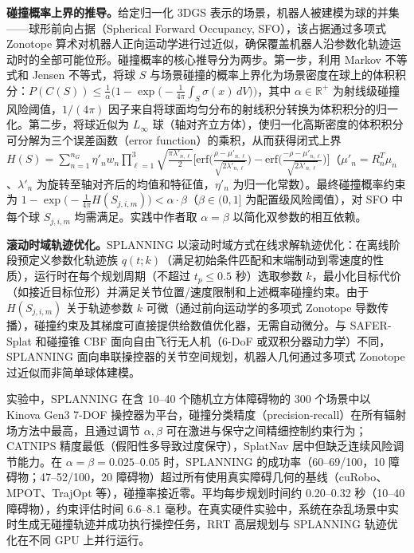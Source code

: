 \textbf{碰撞概率上界的推导。}给定归一化 3DGS 表示的场景，机器人被建模为球的并集——球形前向占据（Spherical Forward Occupancy, SFO），该占据通过多项式 Zonotope 算术对机器人正向运动学进行过近似，确保覆盖机器人沿参数化轨迹运动时的全部可能位形。碰撞概率的核心推导分为两步。第一步，利用 Markov 不等式和 Jensen 不等式，将球 $S$ 与场景碰撞的概率上界化为场景密度在球上的体积积分：$P(C(S)) \leq \frac{1}{\alpha}\bigl(1 - \exp\!\bigl(-\frac{1}{4\pi}\int_S \sigma(x)\, dV\bigr)\bigr)$，其中 $\alpha \in \mathbb{R}^+$ 为射线级碰撞风险阈值，$1/(4\pi)$ 因子来自将球面均匀分布的射线积分转换为体积积分的归一化。第二步，将球近似为 $L_\infty$ 球（轴对齐立方体），使归一化高斯密度的体积积分可分解为三个误差函数（error function）的乘积，从而获得闭式上界 $H(S) = \sum_{n=1}^{n_G} \eta'_n w_n \prod_{\ell=1}^{3} \sqrt{\frac{\pi \lambda'_{n,\ell}}{2}} \bigl[\mathrm{erf}\!\bigl(\frac{\rho - \mu'_{n,\ell}}{\sqrt{2\lambda'_{n,\ell}}}\bigr) - \mathrm{erf}\!\bigl(\frac{-\rho - \mu'_{n,\ell}}{\sqrt{2\lambda'_{n,\ell}}}\bigr)\bigr]$（$\mu'_n = R_n^T \mu_n$、$\lambda'_n$ 为旋转至轴对齐后的均值和特征值，$\eta'_n$ 为归一化常数）。最终碰撞概率约束为 $1 - \exp\!\bigl(-\frac{1}{4\pi} H(S_{j,i,m})\bigr) < \alpha \cdot \beta$（$\beta \in (0,1]$ 为配置级风险阈值），对 SFO 中每个球 $S_{j,i,m}$ 均需满足。实践中作者取 $\alpha = \beta$ 以简化双参数的相互依赖。

\textbf{滚动时域轨迹优化。}SPLANNING 以滚动时域方式在线求解轨迹优化：在离线阶段预定义参数化轨迹族 $q(t;k)$（满足初始条件匹配和末端制动到零速度的性质），运行时在每个规划周期（不超过 $t_p \leq 0.5$ 秒）选取参数 $k$，最小化目标代价（如接近目标位形）并满足关节位置/速度限制和上述概率碰撞约束。由于 $H(S_{j,i,m})$ 关于轨迹参数 $k$ 可微（通过前向运动学的多项式 Zonotope 导数传播），碰撞约束及其梯度可直接提供给数值优化器，无需自动微分。与 SAFER-Splat 和碰撞锥 CBF 面向自由飞行无人机（6-DoF 或双积分器动力学）不同，SPLANNING 面向串联操控器的关节空间规划，机器人几何通过多项式 Zonotope 过近似而非简单球体建模。

实验中，SPLANNING 在含 10--40 个随机立方体障碍物的 300 个场景中以 Kinova Gen3 7-DOF 操控器为平台，碰撞分类精度（precision-recall）在所有辐射场方法中最高，且通过调节 $\alpha,\beta$ 可在激进与保守之间精细控制约束行为；CATNIPS 精度最低（假阳性多导致过度保守），SplatNav 居中但缺乏连续风险调节能力。在 $\alpha = \beta = 0.025$--$0.05$ 时，SPLANNING 的成功率（60--69/100，10 障碍物；47--52/100，20 障碍物）超过所有使用真实障碍几何的基线（cuRobo、MPOT、TrajOpt 等），碰撞率接近零。平均每步规划时间约 0.20--0.32 秒（10--40 障碍物），约束评估时间 6.6--8.1 毫秒。在真实硬件实验中，系统在杂乱场景中实时生成无碰撞轨迹并成功执行操控任务，RRT 高层规划与 SPLANNING 轨迹优化在不同 GPU 上并行运行。

